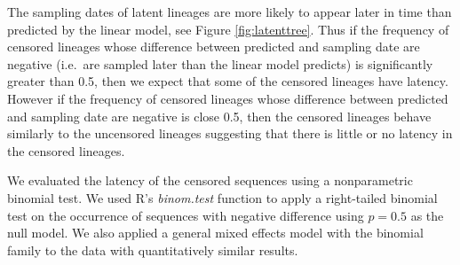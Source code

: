 \documentclass[12pt]{article}
\begin{document}
%
%
%


The sampling dates of latent lineages are more likely to appear later in time than predicted by the linear model, see Figure \ref{fig:latenttree}.
Thus if the frequency of censored lineages whose difference between predicted and sampling date are negative (i.e.~are sampled later than the linear model predicts) is significantly greater than 0.5, then we expect that some of the censored lineages have latency.
However if the frequency of censored lineages whose difference between predicted and sampling date are negative is close 0.5, then the censored lineages behave similarly to the uncensored lineages suggesting that there is little or no latency in the censored lineages.

We evaluated the latency of the censored sequences using a nonparametric binomial test.
We used R's {\it binom.test} function to apply a right-tailed binomial test on the occurrence of sequences with negative difference using $p=0.5$ as the null model.
We also applied a general mixed effects model with the binomial family to the data with quantitatively similar results.
\end{document}
